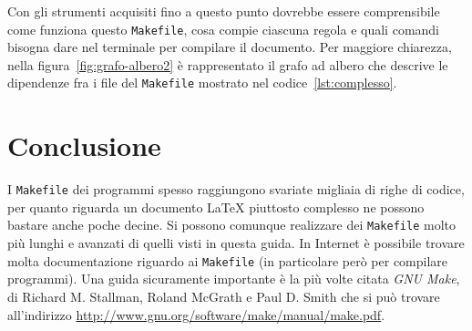 Con gli strumenti acquisiti fino a questo punto dovrebbe essere comprensibile
come funziona questo \verb|Makefile|, cosa compie ciascuna regola e quali
comandi bisogna dare nel terminale per compilare il documento.  Per maggiore
chiarezza, nella figura~\ref{fig:grafo-albero2} è rappresentato il grafo ad
albero che descrive le dipendenze fra i file del \verb|Makefile| mostrato nel
codice~\ref{lst:complesso}.


\section{Conclusione}
\label{sec:conclusione}

I \verb|Makefile| dei programmi spesso raggiungono svariate migliaia di righe di
codice, per quanto riguarda un documento \LaTeX{}
piuttosto complesso ne possono bastare anche poche decine.  Si possono comunque
realizzare dei \verb|Makefile| molto più lunghi e avanzati di quelli visti in
questa guida.  In Internet è possibile trovare molta documentazione riguardo ai
\verb|Makefile| (in particolare però per compilare programmi).  Una guida
sicuramente importante è la più volte citata \emph{GNU Make}, di Richard
M. Stallman, Roland McGrath e Paul D. Smith che si può trovare all'indirizzo
\url{http://www.gnu.org/software/make/manual/make.pdf}.

